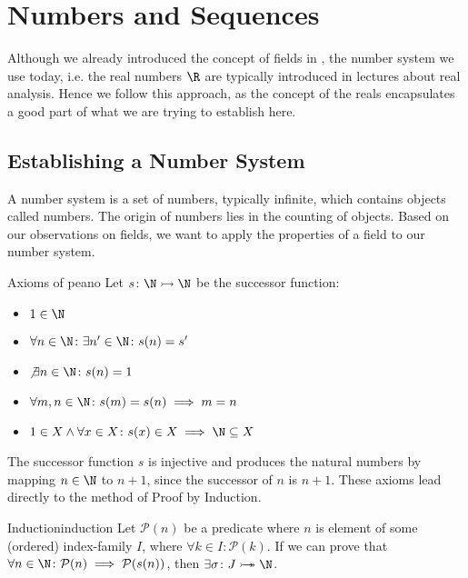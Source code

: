\section{Numbers and Sequences}\label{sec:numb_sequ}

Although we already introduced the concept of fields in , the number system
we use today, i.e. the real numbers $\R$ are typically introduced in lectures about real analysis. Hence we follow this
approach, as the concept of the reals encapsulates a good part of what we are trying to establish here. 

\subsection{Establishing a Number System}\label{ssec:est_numb_sys}

A number system is a set of numbers, typically infinite, which contains objects called numbers. The origin of numbers 
lies in the counting of objects. Based on our observations on fields, we want to apply the properties of a field to 
our number system. 

\begin{definition}{Axioms of }{peano}
    Let $s\colon\N\monmorph\N$ be the successor function:
    \begin{itemize}
        \item $1\in\N$
        \item $\forall n\in\N\colon \exists n'\in\N\colon s(n) = s'$
        \item $\not\exists n\in\N\colon s(n) = 1$
        \item $\forall m,n\in\N\colon s(m) = s(n) \implies m = n$
        \item $1\in X\wedge \forall x\in X\colon s(x)\in X\implies \N\subseteq X$
    \end{itemize}
\end{definition}

The successor function $s$ is injective and produces the natural numbers by mapping $n\in\N$ to $n+1$, since 
the successor of $n$ is $n+1$. These axioms lead directly to the method of Proof by Induction.

\begin{definition}{Induction}{induction}
    Let $\mathcal{P}(n)$ be a predicate where $n$ is element of some (ordered) index-family $I$, where 
    $\forall k\in I\colon\mathcal{P}(k)$. If 
    we can prove that $\forall n\in\N\colon\mathcal{P}(n) \implies \mathcal{P}(s(n))$, then 
    $\exists \sigma\colon J\isomorph\N$.
\end{definition}

